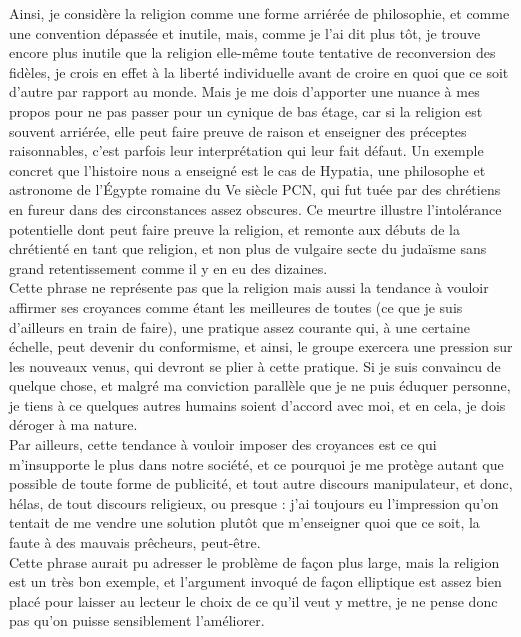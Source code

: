 \documentclass[12pt,a4paper]{article}
\begin{document}
{Ainsi, je considère la religion comme une forme arriérée de philosophie, et comme une convention dépassée et inutile, mais, comme je l'ai dit plus tôt, je trouve encore plus inutile que la religion elle-même toute tentative de reconversion des fidèles, je crois en effet à la liberté individuelle avant de croire en quoi que ce soit d'autre par rapport au monde. Mais je me dois d'apporter une nuance à mes propos pour ne pas passer pour un cynique de bas étage, car si la religion est souvent arriérée, elle peut faire preuve de raison et enseigner des préceptes raisonnables, c'est parfois leur interprétation qui leur fait défaut. Un exemple concret que l’histoire nous a enseigné est le cas de Hypatia, une philosophe et astronome de l’Égypte romaine du Ve siècle PCN, qui fut tuée par des chrétiens en fureur dans des circonstances assez obscures. Ce meurtre illustre l’intolérance potentielle dont peut faire preuve la religion, et remonte aux débuts de la chrétienté en tant que religion, et non plus de vulgaire secte du judaïsme sans grand retentissement comme il y en eu des dizaines.\\

Cette phrase ne représente pas que la religion mais aussi la tendance à vouloir affirmer ses croyances comme étant les meilleures de toutes (ce que je suis d'ailleurs en train de faire), une pratique assez courante qui, à une certaine échelle, peut devenir du conformisme, et ainsi, le groupe exercera une pression sur les nouveaux venus, qui devront se plier à cette pratique. Si je suis convaincu de quelque chose, et malgré ma conviction parallèle que je ne puis éduquer personne, je tiens à ce quelques autres humains soient d'accord avec moi, et en cela, je dois déroger à ma nature.\\

Par ailleurs, cette tendance à vouloir imposer des croyances est ce qui m'insupporte le plus dans notre société, et ce pourquoi je me protège autant que possible de toute forme de publicité, et tout autre discours manipulateur, et donc, hélas, de tout discours religieux, ou presque : j'ai toujours eu l'impression qu'on tentait de me vendre une solution plutôt que m'enseigner quoi que ce soit, la faute à des mauvais prêcheurs, peut-être.\\

Cette phrase aurait pu adresser le problème de façon plus large, mais la religion est un très bon exemple, et l'argument invoqué de façon elliptique est assez bien placé pour laisser au lecteur le choix de ce qu'il veut y mettre, je ne pense donc pas qu'on puisse sensiblement l'améliorer.\\

}
\end{document}
